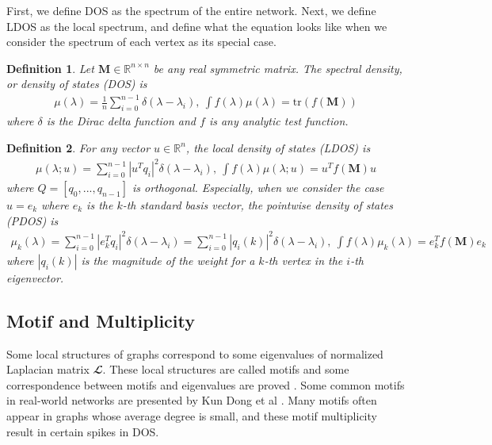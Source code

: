 \documentclass[senior,final,11pt]{iscs-thesis}
\newtheorem{definition}{Definition}
\begin{document}
First, we define DOS as the spectrum of the entire network. Next, we define LDOS as the local spectrum, and define what the equation looks like when we consider the spectrum of each vertex as its special case.
\begin{definition}
    Let ${\mathbf M} \in \mathbb{R}^{n\times n}$ be any real symmetric matrix. The spectral density, or density of states (DOS) is
    \begin{align}
        \mu(\lambda) = \frac{1}{n}\sum_{i=0}^{n-1} \delta(\lambda - \lambda_i), ~ \int f(\lambda)\mu(\lambda)= \mathrm{tr}(f({\mathbf M}))
    \end{align}
    where $\delta$ is the Dirac delta function and $f$ is any analytic test function.
\end{definition}
\begin{definition}
    For any vector $u \in \mathbb{R}^n$, the local density of states (LDOS) is
    \begin{align}
        \mu(\lambda ; u) = \sum_{i=0}^{n-1} |u^T q_i|^2 \delta(\lambda - \lambda_i), ~ \int f(\lambda) \mu(\lambda; u) = u^T f({\mathbf M}) u
    \end{align}
    where $Q=[q_0, ..., q_{n-1}]$ is orthogonal.
    Especially, when we consider the case $u=e_k$ where $e_k$ is the $k$-th standard basis vector, the pointwise density of states (PDOS) is
    \begin{align}
        \mu_k(\lambda) = \sum_{i=0}^{n-1} |e_k^T q_i|^2 \delta(\lambda - \lambda_i) = \sum_{i=0}^{n-1} |q_i(k)|^2 \delta(\lambda - \lambda_i), ~ \int f(\lambda) \mu_k(\lambda) = e_k^T f({\mathbf M}) e_k
    \end{align}
    where $|q_i(k)|$ is the magnitude of the weight for a $k$-th vertex in the $i$-th eigenvector.
\end{definition}


\subsection{Motif and Multiplicity}
Some local structures of graphs correspond to some eigenvalues of normalized Laplacian matrix $\mathbfcal{L}$. These local structures are called motifs and some correspondence between motifs and eigenvalues are proved \cite{banerjee2008spectrum, mehatari2015effect}. Some common motifs in real-world networks are presented by Kun Dong et al \cite{dong2019network}. Many motifs often appear in graphs whose average degree is small, and these motif multiplicity result in certain spikes in DOS.
\end{document}
